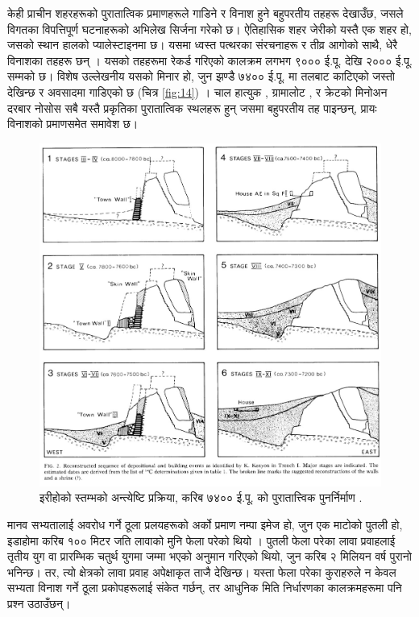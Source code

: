 \documentclass[10pt,twocolumn,letterpaper]{article}
\begin{document}
केही प्राचीन शहरहरूको पुरातात्विक प्रमाणहरूले गाडिने र विनाश हुने बहुपरतीय तहहरू देखाउँछ, जसले विगतका विपत्तिपूर्ण घटनाहरूको अभिलेख सिर्जना गरेको छ। ऐतिहासिक शहर जेरीको यस्तै एक शहर हो, जसको स्थान हालको प्यालेस्टाइनमा छ। यसमा ध्वस्त पत्थरका संरचनाहरू र तीव्र आगोको साथै, धेरै विनाशका तहहरू छन् \cite{96,97}। यसको तहहरूमा रेकर्ड गरिएको कालक्रम लगभग ९००० ई.पू. देखि २००० ई.पू. सम्मको छ। विशेष उल्लेखनीय यसको मिनार हो, जुन झण्डै ७४०० ई.पू. मा तलबाट काटिएको जस्तो देखिन्छ र अवसादमा गाडिएको छ (चित्र \ref{fig:14}) \cite{95}। चाल हात्युक \cite{99}, ग्रामालोट \cite{98}, र क्रेटको मिनोअन दरबार नोसोस \cite{100,101} सबै यस्तै प्रकृतिका पुरातात्विक स्थलहरू हुन् जसमा बहुपरतीय तह पाइन्छन्, प्रायः विनाशको प्रमाणसमेत समावेश छ।

\begin{figure}[t]
\begin{center}

\includegraphics[width=1\linewidth]{jericho.jpg}
\end{center}
   \caption{इरीहोको स्तम्भको अन्त्येष्टि प्रक्रिया, करिब ७४०० ई.पू. को पुरातात्त्विक पुनर्निर्माण \cite{95}.}
\label{fig:14}
\label{fig:onecol}
\end{figure}

मानव सभ्यतालाई अवरोध गर्ने ठूला प्रलयहरूको अर्को प्रमाण नम्पा इमेज हो, जुन एक माटोको पुतली हो, इडाहोमा करिब १०० मिटर जति लावाको मुनि फेला परेको थियो \cite{102,103}। पुतली फेला परेका लावा प्रवाहलाई तृतीय युग वा प्रारम्भिक चतुर्थ युगमा जम्मा भएको अनुमान गरिएको थियो, जुन करिब २ मिलियन वर्ष पुरानो भनिन्छ। तर, त्यो क्षेत्रको लावा प्रवाह अपेक्षाकृत ताजै देखिन्छ। यस्ता फेला परेका कुराहरुले न केवल सभ्यता विनाश गर्ने ठूला प्रकोपहरूलाई संकेत गर्छन्, तर आधुनिक मिति निर्धारणका कालक्रमहरूमा पनि प्रश्न उठाउँछन्।
\end{document}
